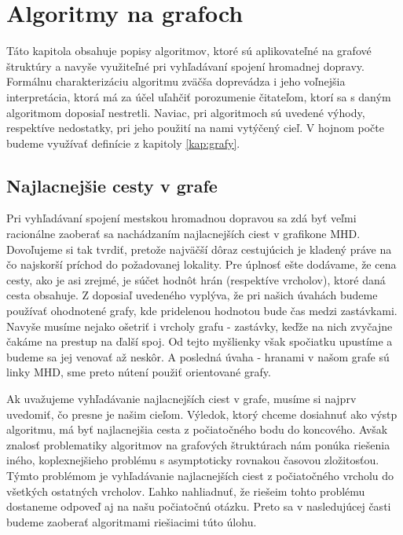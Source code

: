 \chapter{Algoritmy na grafoch}
\label{kap:algoritmy}

Táto kapitola obsahuje popisy algoritmov, ktoré sú aplikovateľné na grafové štruktúry a navyše využiteľné pri vyhľadávaní spojení hromadnej dopravy. Formálnu charakterizáciu algoritmu zväčša doprevádza i jeho voľnejšia interpretácia, ktorá má za účel uľahčiť porozumenie čitateľom, ktorí sa s daným algoritmom doposiaľ nestretli. Naviac, pri algoritmoch sú uvedené výhody, respektíve nedostatky, pri jeho použití na nami vytýčený cieľ. V hojnom počte budeme využívať definície z kapitoly \ref{kap:grafy}.

\section{Najlacnejšie cesty v grafe}

Pri vyhľadávaní spojení mestskou hromadnou dopravou sa zdá byť veľmi racionálne zaoberať sa nachádzaním najlacnejších ciest v grafikone MHD. Dovoľujeme si tak tvrdiť, pretože najväčší dôraz cestujúcich je kladený práve na čo najskorší príchod do požadovanej lokality. Pre úplnosť ešte dodávame, že cena cesty, ako je asi zrejmé, je súčet hodnôt hrán (respektíve vrcholov), ktoré daná cesta obsahuje. Z doposiaľ uvedeného vyplýva, že pri našich úvahách budeme používať ohodnotené grafy, kde pridelenou hodnotou bude čas medzi zastávkami. Navyše musíme nejako ošetriť i vrcholy grafu - zastávky, keďže na nich zvyčajne čakáme na prestup na ďalší spoj. Od tejto myšlienky však spočiatku upustíme a budeme sa jej venovať až neskôr. A posledná úvaha - hranami v našom grafe sú linky MHD, sme preto nútení použiť orientované grafy.\newline

Ak uvažujeme vyhľadávanie najlacnejších ciest v grafe, musíme si najprv uvedomiť, čo presne je našim cieľom. Výledok, ktorý chceme dosiahnuť ako výstp algoritmu, má byť najlacnejšia cesta z počiatočného bodu do koncového. Avšak znalosť problematiky algoritmov na grafových štruktúrach nám ponúka riešenia iného, koplexnejšieho problému s asymptoticky rovnakou časovou zložitosťou. Týmto problémom je vyhľadávanie najlacnejších ciest z počiatočného vrcholu do všetkých ostatných vrcholov. Ľahko nahliadnuť, že riešeim tohto problému dostaneme odpoveď aj na našu počiatočnú otázku.  Preto sa v nasledujúcej časti budeme zaoberať algoritmami riešiacimi túto úlohu.\newline

